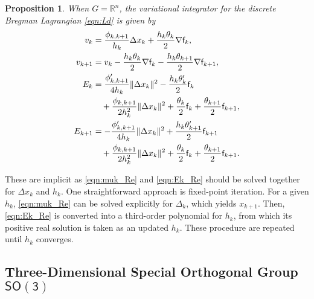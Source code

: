 \documentclass[letterpaper, 10pt, conference]{ieeeconf}
\newcommand{\SO}{\ensuremath{\mathsf{SO(3)}}}
\renewcommand{\Re}{\ensuremath{\mathbb{R}}}
\newtheorem{prop}{Proposition}
\begin{document}
\begin{prop}
    When $G=\Re^n$, the variational integrator for the discrete Bregman Lagrangian \eqref{eqn:Ld} is given by 
\begin{align}
    v_k & =  \frac{\phi_{k,k+1}}{h_k}\Delta x_k + \frac{h_k\theta_k}{2} \nabla \mathsf{f}_k,\label{eqn:muk_Re} \\
    v_{k+1} & = v_k - \frac{h_k\theta_k}{2} \nabla\mathsf{f}_k  -\frac{h_k\theta_{k+1}}{2} \nabla \mathsf{f}_{k+1},  \label{eqn:mukp_Re}\\
    E_{k} & = \frac{\phi'_{k,k+1}}{ 4 h_k} \|\Delta x_k\|^2 -\frac{h_k\theta'_{k}}{2} \mathsf{f}_{k} \nonumber\\\
          & \quad + \frac{\phi_{k,k+1}}{2 h_k^2}\|\Delta x_k\|^2 + \frac{\theta_k}{2}\mathsf{f}_k + \frac{\theta_{k+1}}{2}\mathsf{f}_{k+1},\label{eqn:Ek_Re}\\
    E_{k+1} & = -\frac{\phi'_{k,k+1}}{ 4 h_k} \|\Delta x_k\|^2 +\frac{h_k\theta'_{k+1}}{2} \mathsf{f}_{k+1}\nonumber \\\
            & \quad + \frac{\phi_{k,k+1}}{2 h_k^2}\|\Delta x_k\|^2 +\frac{\theta_k}{2}\mathsf{f}_k + \frac{\theta_{k+1}}{2}\mathsf{f}_{k+1}.
\end{align}
\end{prop}
These are implicit as \eqref{eqn:muk_Re} and \eqref{eqn:Ek_Re} should be solved together for $\Delta x_k$ and $h_k$.
One straightforward approach is fixed-point iteration.
For a given $h_k$, \eqref{eqn:muk_Re} can be solved explicitly for $\Delta_k$, which yields $x_{k+1}$. 
Then, \eqref{eqn:Ek_Re} is converted into a third-order polynomial for $h_k$, from which its positive real solution is taken as an updated $h_k$. 
These procedure are repeated until $h_k$ converges. 

\subsection{Three-Dimensional Special Orthogonal Group $\SO$}
\end{document}
